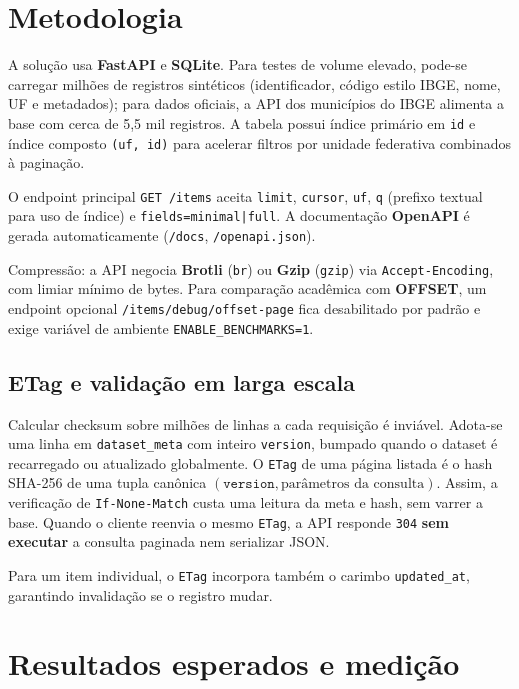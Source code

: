 \documentclass[12pt,a4paper]{article}
\begin{document}
\section{Metodologia}

A solução usa \textbf{FastAPI} e \textbf{SQLite}. Para testes de volume elevado, pode-se carregar milhões de registros sintéticos (identificador, código estilo IBGE, nome, UF e metadados); para dados oficiais, a API dos municípios do IBGE alimenta a base com cerca de 5,5 mil registros. A tabela possui índice primário em \texttt{id} e índice composto \texttt{(uf, id)} para acelerar filtros por unidade federativa combinados à paginação.

O endpoint principal \texttt{GET /items} aceita \texttt{limit}, \texttt{cursor}, \texttt{uf}, \texttt{q} (prefixo textual para uso de índice) e \texttt{fields=minimal|full}. A documentação \textbf{OpenAPI} é gerada automaticamente (\texttt{/docs}, \texttt{/openapi.json}).

Compressão: a API negocia \textbf{Brotli} (\texttt{br}) ou \textbf{Gzip} (\texttt{gzip}) via \texttt{Accept-Encoding}, com limiar mínimo de bytes. Para comparação acadêmica com \textbf{OFFSET}, um endpoint opcional \texttt{/items/debug/offset-page} fica desabilitado por padrão e exige variável de ambiente \texttt{ENABLE\_BENCHMARKS=1}.

\subsection{ETag e validação em larga escala}

Calcular checksum sobre milhões de linhas a cada requisição é inviável. Adota-se uma linha em \texttt{dataset\_meta} com inteiro \texttt{version}, bumpado quando o dataset é recarregado ou atualizado globalmente. O \texttt{ETag} de uma página listada é o hash SHA-256 de uma tupla canônica $(\texttt{version}, \text{parâmetros da consulta})$. Assim, a verificação de \texttt{If-None-Match} custa uma leitura da meta e hash, sem varrer a base. Quando o cliente reenvia o mesmo \texttt{ETag}, a API responde \texttt{304} \textbf{sem executar} a consulta paginada nem serializar JSON.

Para um item individual, o \texttt{ETag} incorpora também o carimbo \texttt{updated\_at}, garantindo invalidação se o registro mudar.

\section{Resultados esperados e medição}
\end{document}
